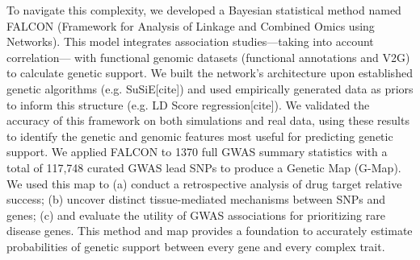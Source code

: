 To navigate this complexity, we developed a Bayesian statistical method named FALCON (Framework for Analysis of Linkage and Combined Omics using Networks). This model integrates association studies—taking into account correlation— with functional genomic datasets (functional annotations and V2G) to calculate genetic support. We built the network's architecture upon established genetic algorithms (e.g. SuSiE[cite]) and used empirically generated data as priors to inform this structure (e.g. LD Score regression[cite]). We validated the accuracy of this framework on both simulations and real data, using these results to identify the genetic and genomic features most useful for predicting genetic support. We applied FALCON to 1370 full GWAS summary statistics with a total of 117,748 curated GWAS lead SNPs to produce a Genetic Map (G-Map). We used this map to (a) conduct a retrospective analysis of drug target relative success; (b) uncover distinct tissue-mediated mechanisms between SNPs and genes; (c) and evaluate the utility of GWAS associations for prioritizing rare disease genes. This method and map provides a foundation to accurately estimate probabilities of genetic support between every gene and every complex trait.


